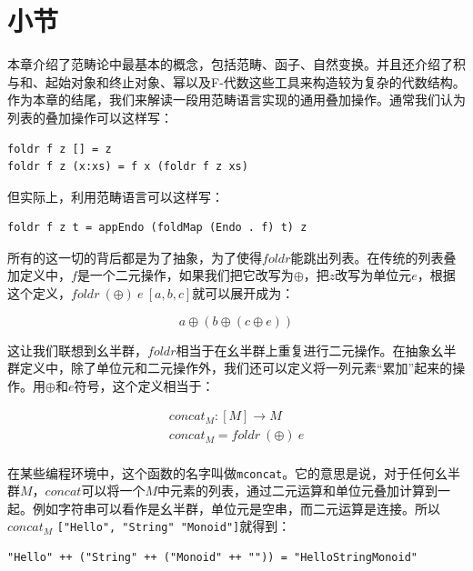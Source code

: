 \documentclass[b5paper]{ctexart}
\begin{document}
\begin{Exercise}
\end{Exercise}

\section{小节}

本章介绍了范畴论中最基本的概念，包括范畴、函子、自然变换。并且还介绍了积与和、起始对象和终止对象、幂以及F-代数这些工具来构造较为复杂的代数结构。作为本章的结尾，我们来解读一段用范畴语言实现的通用叠加操作\cite{Haskell-foldable}。通常我们认为列表的叠加操作可以这样写：

\lstset{language=Haskell, frame=single}
 \begin{lstlisting}
foldr f z [] = z
foldr f z (x:xs) = f x (foldr f z xs)
\end{lstlisting}

但实际上，利用范畴语言可以这样写：

\lstset{frame=single}
\begin{lstlisting}
foldr f z t = appEndo (foldMap (Endo . f) t) z
\end{lstlisting}

所有的这一切的背后都是为了抽象，为了使得$foldr$能跳出列表。在传统的列表叠加定义中，$f$是一个二元操作，如果我们把它改写为$\oplus$，把$z$改写为单位元$e$，根据这个定义，$foldr\ (\oplus)\ e\ [a, b, c]$就可以展开成为：

\[
a \oplus (b \oplus (c \oplus e))
\]

这让我们联想到幺半群，$foldr$相当于在幺半群上重复进行二元操作。在抽象幺半群定义中，除了单位元和二元操作外，我们还可以定义将一列元素“累加”起来的操作。用$\oplus$和$e$符号，这个定义相当于：

\[
\begin{array}{l}
concat_M : [M] \to M \\
concat_M = foldr\ (\oplus)\ e \\
\end{array}
\]

在某些编程环境中，这个函数的名字叫做\texttt{mconcat}。它的意思是说，对于任何幺半群$M$，$concat$可以将一个$M$中元素的列表，通过二元运算和单位元叠加计算到一起。例如字符串可以看作是幺半群，单位元是空串，而二元运算是连接。所以$concat_M$ \texttt{["Hello", "String" "Monoid"]}就得到：

\begin{verbatim}
"Hello" ++ ("String" ++ ("Monoid" ++ "")) = "HelloStringMonoid"
\end{verbatim}
\end{document}
